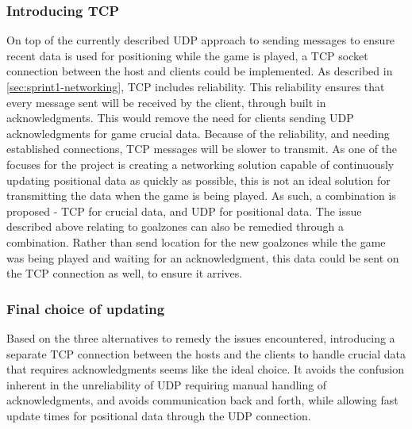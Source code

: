 \subsubsection{Introducing TCP}
On top of the currently described UDP approach to sending messages to ensure recent data is used for positioning while the game is played, a TCP socket connection between the host and clients could be implemented.
As described in \autoref{sec:sprint1-networking}, TCP includes reliability.
This reliability ensures that every message sent will be received by the client, through built in acknowledgments.
This would remove the need for clients sending UDP acknowledgments for game crucial data.
Because of the reliability, and needing established connections, TCP messages will be slower to transmit.
As one of the focuses for the project is creating a networking solution capable of continuously updating positional data as quickly as possible, this is not an ideal solution for transmitting the data when the game is being played.
As such, a combination is proposed - TCP for crucial data, and UDP for positional data.
The issue described above relating to goalzones can also be remedied through a combination.
Rather than send location for the new goalzones while the game was being played and waiting for an acknowledgment, this data could be sent on the TCP connection as well, to ensure it arrives.

\subsubsection{Final choice of updating}
Based on the three alternatives to remedy the issues encountered, introducing a separate TCP connection between the hosts and the clients to handle crucial data that requires acknowledgments seems like the ideal choice.
It avoids the confusion inherent in the unreliability of UDP requiring manual handling of acknowledgments, and avoids communication back and forth, while allowing fast update times for positional data through the UDP connection.
 

